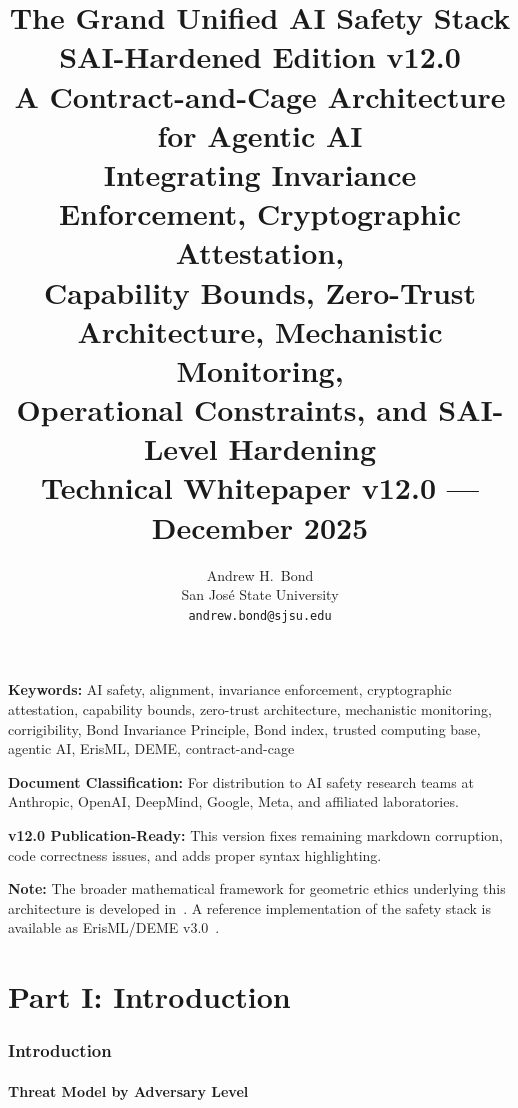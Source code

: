 \documentclass[11pt,letterpaper]{article}
\title{\textbf{The Grand Unified AI Safety Stack}\\
\Large SAI-Hardened Edition v12.0\\[0.5em]
\large A Contract-and-Cage Architecture for Agentic AI\\[0.5em]
\normalsize Integrating Invariance Enforcement, Cryptographic Attestation,\\
Capability Bounds, Zero-Trust Architecture, Mechanistic Monitoring,\\
Operational Constraints, and SAI-Level Hardening\\[1em]
Technical Whitepaper v12.0 --- December 2025}
\author{Andrew H.\ Bond\\
San Jos\'e State University\\
\texttt{andrew.bond@sjsu.edu}}
\date{}
\theoremstyle{definition}
\theoremstyle{remark}
\begin{document}
\maketitle

\noindent\textbf{Keywords:} AI safety, alignment, invariance enforcement, cryptographic attestation, capability bounds, zero-trust architecture, mechanistic monitoring, corrigibility, Bond Invariance Principle, Bond index, trusted computing base, agentic AI, ErisML, DEME, contract-and-cage

\medskip

\noindent\textbf{Document Classification:} For distribution to AI safety research teams at Anthropic, OpenAI, DeepMind, Google, Meta, and affiliated laboratories.

\medskip

\noindent\textbf{v12.0 Publication-Ready:} This version fixes remaining markdown corruption, code correctness issues, and adds proper syntax highlighting.

\medskip

\noindent\textbf{Note:} The broader mathematical framework for geometric ethics underlying this architecture is developed in~\cite{bond2026ge}. A reference implementation of the safety stack is available as ErisML/DEME v3.0~\cite{bond2026erisml}.


\part*{Part I: Introduction}

\section{Introduction}

\subsection{Threat Model by Adversary Level}
\end{document}
